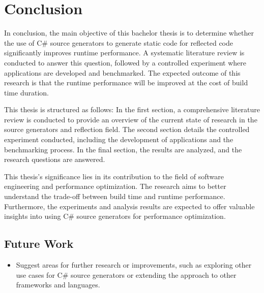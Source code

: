 \chapter{Conclusion}

In conclusion, the main objective of this bachelor thesis is to determine whether the use of C\# source generators to generate static code for reflected code significantly improves runtime performance. A systematic literature review is conducted to answer this question, followed by a controlled experiment where applications are developed and benchmarked. The expected outcome of this research is that the runtime performance will be improved at the cost of build time duration.

This thesis is structured as follows: In the first section, a comprehensive literature review is conducted to provide an overview of the current state of research in the source generators and reflection field. The second section details the controlled experiment conducted, including the development of applications and the benchmarking process. In the final section, the results are analyzed, and the research questions are answered.

This thesis's significance lies in its contribution to the field of software engineering and performance optimization. The research aims to better understand the trade-off between build time and runtime performance. Furthermore, the experiments and analysis results are expected to offer valuable insights into using C\# source generators for performance optimization.

\section{Future Work}
\begin{itemize}
    \item Suggest areas for further research or improvements, such as exploring other use cases for C\# source generators or extending the approach to other frameworks and languages.
\end{itemize}